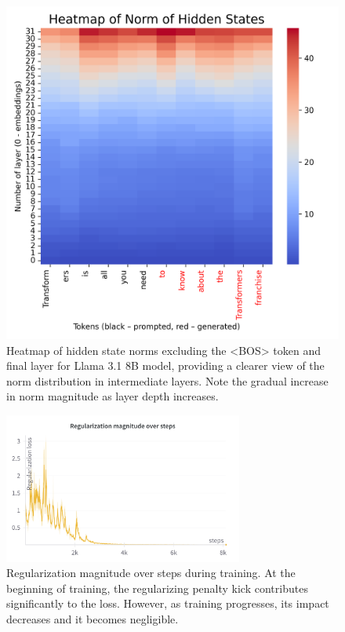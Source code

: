 \begin{figure}[h]
\begin{minipage}{0.48\textwidth}
        \includegraphics[width=\textwidth]{images/heatmap_8b_notfull.png}
        \caption{Heatmap of hidden state norms excluding the <BOS> token and final layer for Llama 3.1 8B model, providing a clearer view of the norm distribution in intermediate layers. Note the gradual increase in norm magnitude as layer depth increases.}
        \label{fig:heatmap_8b_notfull}
    \end{minipage}
\end{figure}

\begin{figure}[h]
    \centering
    \includegraphics[width=0.7\textwidth]{images/reg_loss.png}
    \caption{Regularization magnitude over steps during training. At the beginning of training, the regularizing penalty kick contributes significantly to the loss. However, as training progresses, its impact decreases and it becomes negligible.}
    \label{fig:reg_loss}
\end{figure}

